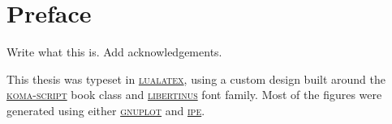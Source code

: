 \chapter*{Preface}\noindent
Write what this is. Add acknowledgements.

This thesis was typeset in \href{http://www.luatex.org/}{\textsc{lualatex}}, using a custom design built around the \href{https://ctan.org/pkg/koma-script?lang=en}{\textsc{koma-script}} book class and \href{https://github.com/khaledhosny/libertinus}{\textsc{libertinus}} font family.
Most of the figures were generated using either \href{http://www.gnuplot.info/}{\textsc{gnuplot}} and \href{https://ipe.otfried.org/}{\textsc{ipe}}.
